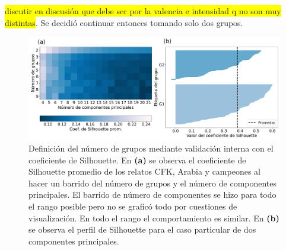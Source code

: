 \colorbox{yellow}{discutir en discusión que debe ser por la valencia e intensidad q no son muy distintas}. Se decidió continuar entonces tomando solo dos grupos.

\begin{figure}[h]
    \centering
    \includegraphics[width = 15cm]{figures/ch03/PCA_clustering/Primer tiempo/silhouette2_cfk_pres_ar_control.pdf} 
    \caption{Definición del número de grupos mediante validación interna con el coeficiente de Silhouette. En \textbf{(a)} se observa el coeficiente de Silhouette promedio de los relatos CFK, Arabia y campeones al hacer un barrido del número de grupos y el número de componentes principales. El barrido de número de componentes se hizo para todo el rango posible pero no se graficó todo por cuestiones de visualización. En todo el rango el comportamiento es similar. En \textbf{(b)} se observa el perfil de Silhouette para el caso particular de dos componentes principales.}
\label{fig:cap3_defk_cfkArCamp}
\end{figure}

